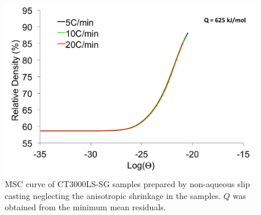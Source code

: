 \newpage
\begin{figure}[H]
	\centering
	\includegraphics[width=\textwidth]{Chapter-6/Figures/Figure7.png}
	\caption{MSC curve of CT3000LS-SG samples prepared by non-aqueous slip casting neglecting the anisotropic shrinkage in the samples. $Q$ was obtained from the minimum mean residuals.}
	\label{Ch6-figure:Figure7}
\end{figure}


